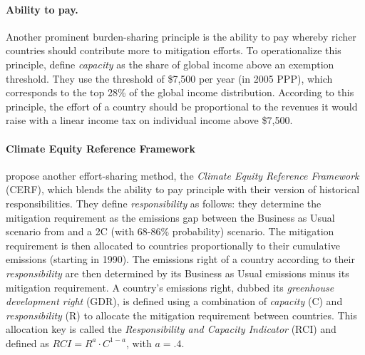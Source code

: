 \paragraph{Ability to pay.} Another prominent burden-sharing principle is the ability to pay whereby richer countries should contribute more to mitigation efforts. To operationalize this principle, \citet{baer_greenhouse_2008} define \textit{capacity} as the share of global income above an exemption threshold. They use the threshold of \$7,500 per year (in 2005 PPP), which corresponds to the top 28\% of the global income distribution. According to this principle, the effort of a country should be proportional to the revenues it would raise with a linear income tax on individual income above \$7,500. 

\paragraph{Climate Equity Reference Framework} \citet{baer_greenhouse_2008} %
propose another effort-sharing method, %
the \textit{Climate Equity Reference Framework} (CERF), which blends the ability to pay principle with their version of historical responsibilities. They define \textit{responsibility} as follows: they determine the mitigation requirement as the emissions gap between the Business as Usual scenario from \citet{iea_world_2007} and a 2\textdegree{}C (with 68-86\% probability) scenario. The mitigation requirement is then allocated to countries proportionally to their cumulative emissions (starting in 1990). The emissions right of a country according to their \textit{responsibility} are then determined by its Business as Usual emissions minus its mitigation requirement. A country's emissions right, dubbed its \textit{greenhouse development right} (GDR), 
is defined using a combination of \textit{capacity} (C) and \textit{responsibility} (R) to allocate the mitigation requirement between countries. This allocation key is called the \textit{Responsibility and Capacity Indicator} (RCI) and defined as $RCI = R^{a}\cdot C^{1-a}$, with $a=.4$. 

